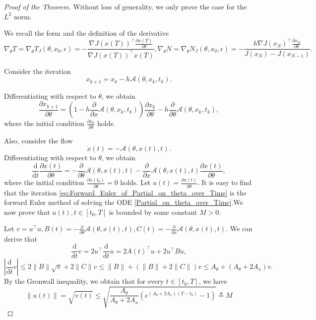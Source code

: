 \documentclass{article}
\newcommand{\Acal}{\mathcal{A}}
\newcommand{\dd}{\mathrm{d}}
\begin{document}
\iffalse
\begin{proof}[Proof of the Theorem]
    Without loss of generality, we only prove the case for the $L^2$ norm. 

    We recall the form and the definition of the derivative 
    \[
    \nabla_{\theta} T = \nabla_{\theta}T_J(\theta,x_0,\epsilon)=
    -\frac{\nabla J(x(T))^\top\frac{\partial x(T)}{\partial \theta}}{\nabla J(x(T))^\top\dot{x}(T)},
    \nabla_{\theta}N=
    \nabla_{\theta}N_J(\theta,x_0,\epsilon)=
    -\frac{h\nabla J(x_N)^\top\frac{\partial x_N}{\partial \theta}}{J(x_N)-J(x_{N-1})}.
    \]

    Consider the iteration \[
    x_{k+1} = x_k - h\mathcal{A}(\theta,x_k,t_k).
    \]

    Differentiating with respect to $\theta$, we obtain
    \begin{equation}\label{eq:Forward_Euler_of_Partial_on_theta_over_Time}
        \frac{\partial x_{k+1}}{\partial \theta} = 
        (1-h\frac{\partial}{\partial x}\Acal(\theta,x_k,t_k))\frac{\partial x_k}{\partial \theta} - h\frac{\partial}{\partial \theta}\Acal(\theta,x_k,t_k),
    \end{equation}
    where the initial condition $\frac{\partial x_0}{\partial \theta}$ holds. 

    Also, consider the flow 
    \[
    \dot{x}(t) = -\Acal(\theta,x(t),t).
    \]
    Differentiating with respect to $\theta$, we obtain
    \begin{equation}\label{Partial_on_theta_over_Time}
        \frac{\dd }{\dd t}
        \frac{\partial x(t)}{\partial \theta} = -\frac{\partial}{\partial \theta}\Acal(\theta,x(t),t) - 
        \frac{\partial}{\partial x}\Acal(\theta,x(t),t)\frac{\partial x(t)}{\partial \theta}, 
    \end{equation}
    where the initial condition $\frac{\partial x(t_0)}{\partial \theta}=0$ holds. Let $u(t) = \frac{\partial x(t)}{\partial\theta}$. It is easy to find that the iteration \ref{eq:Forward_Euler_of_Partial_on_theta_over_Time} is the forward Euler method of solving the ODE \ref{Partial_on_theta_over_Time}.We now prove that $u(t),t\in[t_0,T]$ is bounded by some constant $M>0$. 

    Let $v=u^\top u,B(t) = -\frac{\partial}{\partial \theta}\Acal(\theta,x(t),t),C(t) = - 
        \frac{\partial}{\partial x}\Acal(\theta,x(t),t)$. We can derive that \[\frac{\dd}{\dd t}v=2u^\top \frac{\dd}{\dd t}u=2A(t)^\top u+2u^\top Bu,\]
        \[
        |\frac{\dd}{\dd t}v|\leq 2\|B\|\sqrt{v}+2\|C\|v\leq\|B\|+(\|B\|+2\|C\|)v\leq
        A_{\theta}+(A_{\theta}+2A_x)v.
        \]
        By the Gronwall inequality, we obtain that for every $t\in[t_0,T]$, we have 
        \begin{equation}
        \label{eq:err_u}
        \|u(t)\|=\sqrt{v(t)}\leq\sqrt{\frac{A_{\theta}}{A_{\theta}+2A_x}(e^{(A_{\theta}+2A_x)(T-t_0)}-1)}\triangleq M
        \end{equation}
    

\end{proof}
\end{document}
